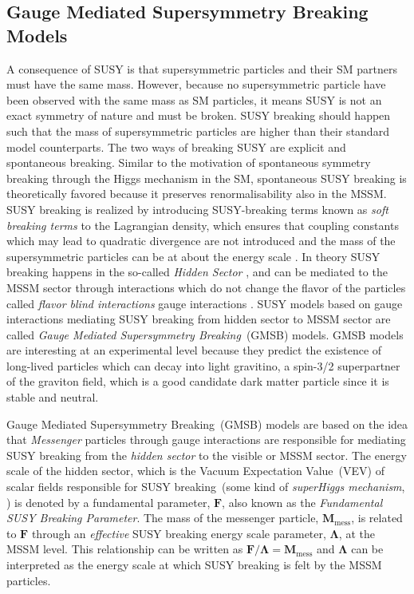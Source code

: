 \subsection{Gauge Mediated Supersymmetry Breaking Models}
A consequence of SUSY is that supersymmetric particles and their SM partners must have the same mass. However, because no supersymmetric particle have been observed with the same mass as SM particles, it means SUSY is not an exact symmetry of nature and must be broken. SUSY breaking should happen such that the mass of supersymmetric particles are higher than their standard model counterparts. 
 The two ways of breaking SUSY are explicit and spontaneous breaking.
Similar to the motivation of spontaneous symmetry breaking through the Higgs mechanism in the SM, spontaneous SUSY breaking is theoretically favored because it preserves renormalisability also in the MSSM. SUSY breaking is realized by introducing SUSY-breaking terms known as \textit{soft breaking terms} to the Lagrangian density, which ensures that coupling constants which may lead to quadratic divergence are not introduced and the mass of the supersymmetric particles can be at about the \TeV energy scale \cite{SUSYM,SUSYBOOK,SUSYN}.
In theory SUSY breaking happens in the so-called \textit{Hidden Sector} \cite{SUSYBOOK}, and can be mediated to the MSSM sector through interactions which do not change the flavor of the particles called \textit{flavor blind interactions} \eg gauge interactions \cite{GMSB}.
SUSY models based on gauge interactions mediating SUSY breaking from hidden sector to MSSM sector are called \textit{Gauge Mediated Supersymmetry Breaking}~(GMSB) models. GMSB models are interesting at an experimental level because they predict the existence of long-lived particles which can decay into light gravitino, a spin-3/2 superpartner of the graviton field, which is a good candidate dark matter particle since it is stable and neutral.
\par 
Gauge Mediated Supersymmetry Breaking~(GMSB) models are based on the idea that \textit{Messenger} particles through gauge interactions are responsible for mediating SUSY breaking from the \textit{hidden sector} to the visible or MSSM sector. The energy scale of the hidden sector, which is the Vacuum Expectation Value~(VEV) of scalar fields responsible for SUSY breaking~(some kind of \textit{superHiggs mechanism}, \cite{SUSYBOOK}) is denoted by a fundamental parameter, $\mathbf{F}$, also known as the \textit{Fundamental SUSY Breaking Parameter}.
The mass of the messenger particle, $\mathbf{M}_{\mbox{mess}}$, is related to $\mathbf{F}$ through an \textit{effective} SUSY breaking energy scale parameter, $\mathbf{\Lambda}$, at the MSSM level. This relationship can be written as $\mathbf{F}/\mathbf{\Lambda}  = \mathbf{M}_{\mbox{mess}}$ and  $\mathbf{\Lambda}$ can be interpreted as the energy scale at which SUSY breaking is felt by the MSSM particles.
